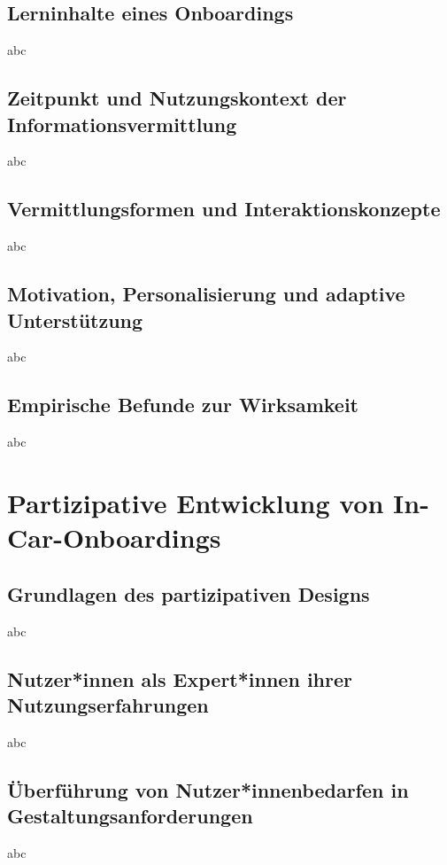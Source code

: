 \subsection{Lerninhalte eines Onboardings}
\label{subsec:onboarding_lerninhalte}
abc

\subsection{Zeitpunkt und Nutzungskontext der Informationsvermittlung}
\label{subsec:onboarding_zeitpunkt}
abc

\subsection{Vermittlungsformen und Interaktionskonzepte}
\label{subsec:onboarding_vermittlungsformen}
abc

\subsection{Motivation, Personalisierung und adaptive Unterstützung}
\label{subsec:onboarding_adaptivitaet}
abc

\subsection{Empirische Befunde zur Wirksamkeit}
\label{subsec:onboarding_wirksamkeit}
abc


\section{Partizipative Entwicklung von In-Car-Onboardings}
\label{sec:partizipative_entwicklung}

\subsection{Grundlagen des partizipativen Designs}
\label{subsec:grundlagen_partizipatives_design}
abc

\subsection{Nutzer*innen als Expert*innen ihrer Nutzungserfahrungen}
\label{subsec:nutzende_expertinnen}
abc

\subsection{Überführung von Nutzer*innenbedarfen in Gestaltungsanforderungen}
\label{subsec:anforderungsableitung}
abc


